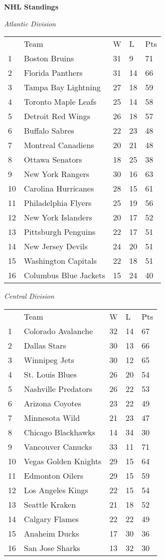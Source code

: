 \textbf{NHL Standings}

\textit{Atlantic Division}
\begin{tabular}{lllll}
 & Team & W & L & Pts \\
1 & Boston Bruins & 31 & 9 & 71 \\
2 & Florida Panthers & 31 & 14 & 66 \\
3 & Tampa Bay Lightning & 27 & 18 & 59 \\
4 & Toronto Maple Leafs & 25 & 14 & 58 \\
5 & Detroit Red Wings & 26 & 18 & 57 \\
6 & Buffalo Sabres & 22 & 23 & 48 \\
7 & Montreal Canadiens & 20 & 21 & 48 \\
8 & Ottawa Senators & 18 & 25 & 38 \\
9 & New York Rangers & 30 & 16 & 63 \\
10 & Carolina Hurricanes & 28 & 15 & 61 \\
11 & Philadelphia Flyers & 25 & 19 & 56 \\
12 & New York Islanders & 20 & 17 & 52 \\
13 & Pittsburgh Penguins & 22 & 17 & 51 \\
14 & New Jersey Devils & 24 & 20 & 51 \\
15 & Washington Capitals & 22 & 18 & 51 \\
16 & Columbus Blue Jackets & 15 & 24 & 40 \\
\end{tabular}


\textit{Central Division}
\begin{tabular}{lllll}
 & Team & W & L & Pts \\
1 & Colorado Avalanche & 32 & 14 & 67 \\
2 & Dallas Stars & 30 & 13 & 66 \\
3 & Winnipeg Jets & 30 & 12 & 65 \\
4 & St. Louis Blues & 26 & 20 & 54 \\
5 & Nashville Predators & 26 & 22 & 53 \\
6 & Arizona Coyotes & 23 & 22 & 49 \\
7 & Minnesota Wild & 21 & 23 & 47 \\
8 & Chicago Blackhawks & 14 & 34 & 30 \\
9 & Vancouver Canucks & 33 & 11 & 71 \\
10 & Vegas Golden Knights & 29 & 15 & 64 \\
11 & Edmonton Oilers & 29 & 15 & 59 \\
12 & Los Angeles Kings & 22 & 15 & 54 \\
13 & Seattle Kraken & 21 & 18 & 52 \\
14 & Calgary Flames & 22 & 22 & 49 \\
15 & Anaheim Ducks & 17 & 30 & 36 \\
16 & San Jose Sharks & 13 & 32 & 30 \\
\end{tabular}


